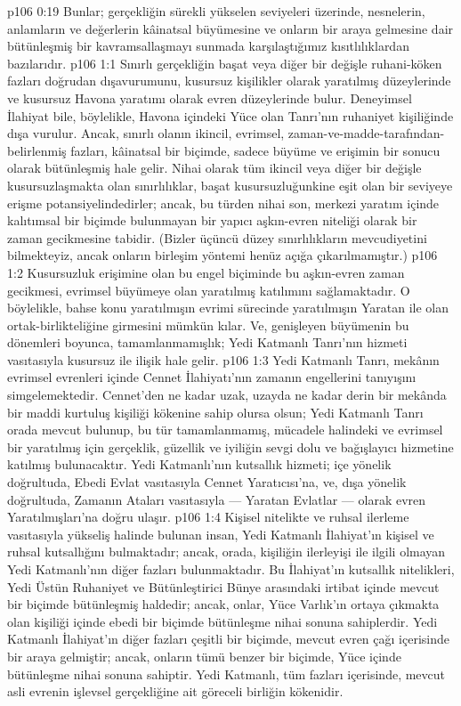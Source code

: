 \vs p106 0:19 Bunlar; gerçekliğin sürekli yükselen seviyeleri üzerinde, nesnelerin, anlamların ve değerlerin kâinatsal büyümesine ve onların bir araya gelmesine dair bütünleşmiş bir kavramsallaşmayı sunmada karşılaştığımız kısıtlılıklardan bazılarıdır.
\vs p106 1:1 Sınırlı gerçekliğin başat veya diğer bir değişle ruhani\hyp{}köken fazları doğrudan dışavurumunu, kusursuz kişilikler olarak yaratılmış düzeylerinde ve kusursuz Havona yaratımı olarak evren düzeylerinde bulur. Deneyimsel İlahiyat bile, böylelikle, Havona içindeki Yüce olan Tanrı’nın ruhaniyet kişiliğinde dışa vurulur. Ancak, sınırlı olanın ikincil, evrimsel, zaman\hyp{}ve\hyp{}madde\hyp{}tarafından\hyp{}belirlenmiş fazları, kâinatsal bir biçimde, sadece büyüme ve erişimin bir sonucu olarak bütünleşmiş hale gelir. Nihai olarak tüm ikincil veya diğer bir değişle kusursuzlaşmakta olan sınırlılıklar, başat kusursuzluğunkine eşit olan bir seviyeye erişme potansiyelindedirler; ancak, bu türden nihai son, merkezi yaratım içinde kalıtımsal bir biçimde bulunmayan bir yapıcı aşkın\hyp{}evren niteliği olarak bir zaman gecikmesine tabidir. (Bizler üçüncü düzey sınırlılıkların mevcudiyetini bilmekteyiz, ancak onların birleşim yöntemi henüz açığa çıkarılmamıştır.)
\vs p106 1:2 Kusursuzluk erişimine olan bu engel biçiminde bu aşkın\hyp{}evren zaman gecikmesi, evrimsel büyümeye olan yaratılmış katılımını sağlamaktadır. O böylelikle, bahse konu yaratılmışın evrimi sürecinde yaratılmışın Yaratan ile olan ortak\hyp{}birlikteliğine girmesini mümkün kılar. Ve, genişleyen büyümenin bu dönemleri boyunca, tamamlanmamışlık; Yedi Katmanlı Tanrı’nın hizmeti vasıtasıyla kusursuz ile ilişik hale gelir.
\vs p106 1:3 Yedi Katmanlı Tanrı, mekânın evrimsel evrenleri içinde Cennet İlahiyatı’nın zamanın engellerini tanıyışını simgelemektedir. Cennet’den ne kadar uzak, uzayda ne kadar derin bir mekânda bir maddi kurtuluş kişiliği kökenine sahip olursa olsun; Yedi Katmanlı Tanrı orada mevcut bulunup, bu tür tamamlanmamış, mücadele halindeki ve evrimsel bir yaratılmış için gerçeklik, güzellik ve iyiliğin sevgi dolu ve bağışlayıcı hizmetine katılmış bulunacaktır. Yedi Katmanlı’nın kutsallık hizmeti; içe yönelik doğrultuda, Ebedi Evlat vasıtasıyla Cennet Yaratıcısı’na, ve, dışa yönelik doğrultuda, Zamanın Ataları vasıtasıyla --- Yaratan Evlatlar --- olarak evren Yaratılmışları’na doğru ulaşır.
\vs p106 1:4 Kişisel nitelikte ve ruhsal ilerleme vasıtasıyla yükseliş halinde bulunan insan, Yedi Katmanlı İlahiyat’ın kişisel ve ruhsal kutsallığını bulmaktadır; ancak, orada, kişiliğin ilerleyişi ile ilgili olmayan Yedi Katmanlı’nın diğer fazları bulunmaktadır. Bu İlahiyat’ın kutsallık nitelikleri, Yedi Üstün Ruhaniyet ve Bütünleştirici Bünye arasındaki irtibat içinde mevcut bir biçimde bütünleşmiş haldedir; ancak, onlar, Yüce Varlık’ın ortaya çıkmakta olan kişiliği içinde ebedi bir biçimde bütünleşme nihai sonuna sahiplerdir. Yedi Katmanlı İlahiyat’ın diğer fazları çeşitli bir biçimde, mevcut evren çağı içerisinde bir araya gelmiştir; ancak, onların tümü benzer bir biçimde, Yüce içinde bütünleşme nihai sonuna sahiptir. Yedi Katmanlı, tüm fazları içerisinde, mevcut asli evrenin işlevsel gerçekliğine ait göreceli birliğin kökenidir.
